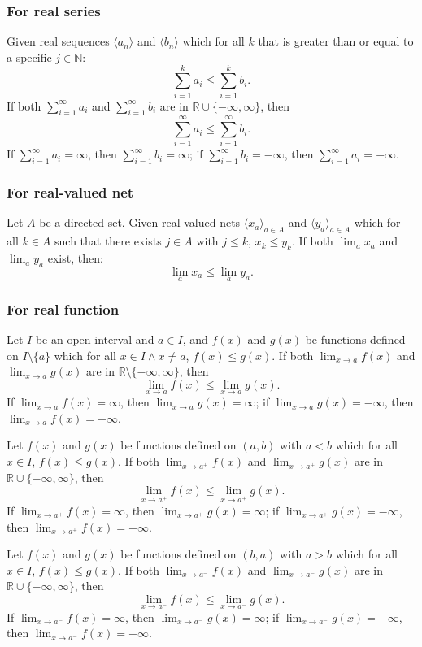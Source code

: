 \subsubsection{For real series}
Given real sequences $\langle a_n\rangle$ and $\langle b_n\rangle$ which for all $k$ that is greater than or equal to a specific $j\in \mathbb{N}$:
\[\sum_{i=1}^ka_i\leq\sum_{i=1}^kb_i.\]
If both $\sum_{i=1}^{\infty}a_i$ and $\sum_{i=1}^{\infty}b_i$ are in $\mathbb{R}\cup\{-\infty,\infty\}$, then
\[\sum_{i=1}^{\infty}a_i\leq\sum_{i=1}^{\infty}b_i.\]
If $\sum_{i=1}^{\infty}a_i=\infty$, then $\sum_{i=1}^{\infty}b_i=\infty$; if $\sum_{i=1}^{\infty}b_i=-\infty$, then $\sum_{i=1}^{\infty}a_i=-\infty$.
\subsubsection{For real-valued net}
Let $A$ be a directed set. Given real-valued nets $\langle x_a\rangle_{a\in A}$ and $\langle y_a\rangle_{a\in A}$ which for all $k\in A$ such that there exists $j\in A$ with $j\leq k$, $x_k\leq y_k$. If both $\lim_{a}x_a$ and $\lim_{a}y_a$ exist, then:
\[\lim_{a}x_a\leq\lim_{a}y_a.\]
\subsubsection{For real function}
Let $I$ be an open interval and $a\in I$, and $f(x)$ and $g(x)$ be functions defined on $I\setminus\{a\}$ which for all $x\in I\land x\neq a$, $f(x)\leq g(x)$. If both $\lim_{x\to a}f(x)$ and $\lim_{x\to a}g(x)$ are in $\mathbb{R}\setminus\{-\infty,\infty\}$, then
\[\lim_{x\to a}f(x)\leq\lim_{x\to a}g(x).\]
If $\lim_{x\to a}f(x)=\infty$, then $\lim_{x\to a}g(x)=\infty$; if $\lim_{x\to a}g(x)=-\infty$, then $\lim_{x\to a}f(x)=-\infty$.

Let $f(x)$ and $g(x)$ be functions defined on $(a,b)$ with $a<b$ which for all $x\in I$, $f(x)\leq g(x)$. If both $\lim_{x\to a^+}f(x)$ and $\lim_{x\to a^+}g(x)$ are in $\mathbb{R}\cup\{-\infty,\infty\}$, then
\[\lim_{x\to a^+}f(x)\leq\lim_{x\to a^+}g(x).\]
If $\lim_{x\to a^+}f(x)=\infty$, then $\lim_{x\to a^+}g(x)=\infty$; if $\lim_{x\to a^+}g(x)=-\infty$, then $\lim_{x\to a^+}f(x)=-\infty$.

Let $f(x)$ and $g(x)$ be functions defined on $(b,a)$ with $a>b$ which for all $x\in I$, $f(x)\leq g(x)$. If both $\lim_{x\to a^-}f(x)$ and $\lim_{x\to a^-}g(x)$ are in $\mathbb{R}\cup\{-\infty,\infty\}$, then
\[\lim_{x\to a^-}f(x)\leq\lim_{x\to a^-}g(x).\]
If $\lim_{x\to a^-}f(x)=\infty$, then $\lim_{x\to a^-}g(x)=\infty$; if $\lim_{x\to a^-}g(x)=-\infty$, then $\lim_{x\to a^-}f(x)=-\infty$.

